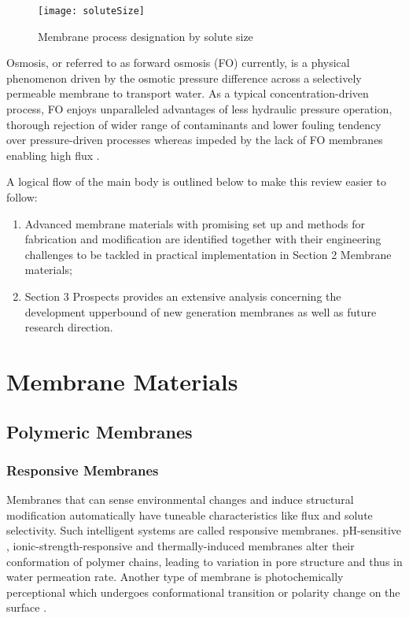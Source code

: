 \documentclass[a4paper,12pt]{report}
\begin{document}
\begin{figure}[h!]
\centering
  \texttt{[image: soluteSize]}
  \caption{Membrane process designation by solute size}
  \label{soluteSize}
\end{figure}

Osmosis, or referred to as forward osmosis (FO) currently, is a physical phenomenon driven by the osmotic pressure difference across a selectively permeable membrane to transport water. As a typical concentration-driven process, FO enjoys unparalleled advantages of less hydraulic pressure operation, thorough rejection of wider range of contaminants and lower fouling tendency over pressure-driven processes \citep{cath06} whereas impeded by the lack of FO membranes enabling high flux \citep{wang10}.

A logical ﬂow of the main body is outlined below to make this review easier to follow:
\begin{enumerate}
\item Advanced membrane materials with promising set up and methods for fabrication and modification are identified together with their engineering challenges to be tackled in practical implementation in Section 2 Membrane materials;
\item Section 3 Prospects provides an extensive analysis concerning the development upperbound of new generation membranes as well as future research direction.
\end{enumerate}

\chapter{Membrane Materials}
\section{Polymeric Membranes}

\subsection{Responsive Membranes}
Membranes that can sense environmental changes and induce structural modification automatically have tuneable characteristics like flux and solute selectivity. Such intelligent systems are called responsive membranes. pH-sensitive \citep{481oak, 482gud}, ionic-strength-responsive\citep{49zha, 492sin} and thermally-induced \citep{50yin} membranes alter their conformation of polymer chains, leading to variation in pore structure and thus in water permeation rate. Another type of membrane is photochemically perceptional which undergoes conformational transition or polarity change on the surface \citep{53kim}. 
\end{document}
